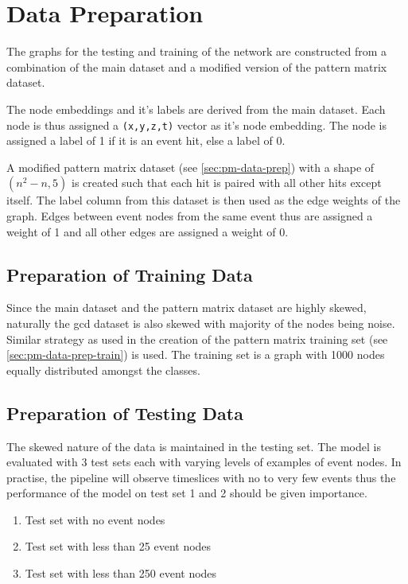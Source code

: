 \section{Data Preparation}
\label{sec:gcd-data-prep}

The graphs for the testing and training of the network are constructed
from a combination of the main dataset and a modified version of the
pattern matrix dataset.

The node embeddings and it's labels are derived from the main dataset.
Each node is thus assigned a \texttt{(x,y,z,t)} vector as it's node
embedding. The node is assigned a label of 1 if it is an event hit,
else a label of 0.

A modified pattern matrix dataset (see \ref{sec:pm-data-prep}) with a
shape of \texttt{$(n^{2}-n, 5)$} is created such that each hit is paired
with all other hits except itself. The label column from this dataset
is then used as the edge weights of the graph. Edges between event
nodes from the same event thus are assigned a weight of 1 and all
other edges are assigned a weight of 0.

\subsection{Preparation of Training Data}
\label{sec:gcd-data-prep-train}

Since the main dataset and the pattern matrix dataset are highly
skewed, naturally the gcd dataset is also skewed with majority of the
nodes being noise. Similar strategy as used in the creation of the
pattern matrix training set (see \ref{sec:pm-data-prep-train}) is
used. The training set is a graph with 1000 nodes equally distributed
amongst the classes.

\subsection{Preparation of Testing Data}
\label{sec:gcd-data-prep-test}

The skewed nature of the data is maintained in the testing set. The
model is evaluated with 3 test sets each with varying levels of
examples of event nodes. In practise, the pipeline will observe
timeslices with no to very few events thus the performance of the
model on test set 1 and 2 should be given importance.

\begin{enumerate}
\item Test set with no event nodes
\item Test set with less than 25 event nodes
\item Test set with less than 250 event nodes
\end{enumerate}

